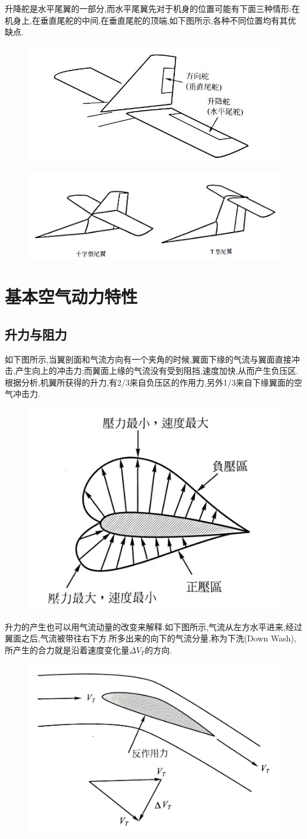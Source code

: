 \documentclass[9pt, oneside]{book}
\begin{document}
升降舵是水平尾翼的一部分,而水平尾翼先对于机身的位置可能有下面三种情形:在机身上,在垂直尾舵的中间,在垂直尾舵的顶端,如下图所示,各种不同位置均有其优缺点.
\begin{figure}[H]
    \centering
    \includegraphics[width=0.5\linewidth]{image/2-11.jpg}
\end{figure}
\begin{figure}[H]
    \centering
    \includegraphics[width=0.6\linewidth]{image/2-12.jpg}
\end{figure}

\section{基本空气动力特性}

\subsection{升力与阻力}

如下图所示,当翼剖面和气流方向有一个夹角的时候,翼面下缘的气流与翼面直接冲击,产生向上的冲击力;而翼面上缘的气流没有受到阻挡,速度加快,从而产生负压区.根据分析,机翼所获得的升力,有2/3来自负压区的作用力,另外1/3来自下缘翼面的空气冲击力.
\begin{figure}[H]
    \centering
    \includegraphics[width=0.35\linewidth]{image/2-13.jpg}
\end{figure}

升力的产生也可以用气流动量的改变来解释.如下图所示,气流从左方水平进来,经过翼面之后,气流被带往右下方.所多出来的向下的气流分量,称为下洗(Down Wash),所产生的合力就是沿着速度变化量$\Delta V_T$的方向.
\begin{figure}[H]
    \centering
    \includegraphics[width=0.4\linewidth]{image/2-14.jpg}
\end{figure}
\end{document}
